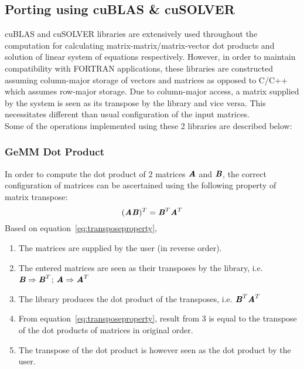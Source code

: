 \documentclass[thesis.tex]{subfiles}
\begin{document}
\subsection{Porting using cuBLAS \& cuSOLVER}
cuBLAS and cuSOLVER libraries are extensively used throughout the computation for calculating matrix-matrix/matrix-vector dot products and solution of linear system of equations respectively. However, in order to maintain compatibility with FORTRAN applications, these libraries are constructed assuming column-major storage of vectors and matrices as opposed to C/C++ which assumes row-major storage. Due to column-major access, a matrix supplied by the system is seen as its transpose by the library and vice versa. This necessitates different than usual configuration of the input matrices.\\
Some of the operations implemented using these 2 libraries are described below:

\subsubsection{GeMM Dot Product}
In order to compute the dot product of 2 matrices $\textbf{\textit{A}}$ and $\textbf{\textit{B}}$, the correct configuration of matrices can be ascertained using the following property of matrix transpose:
\begin{equation}\label{eq:transposeproperty}
(\textbf{\textit{AB}})^{T} = \textbf{\textit{B}}^{T}\textbf{\textit{A}}^{T}
\end{equation}
Based on equation~\ref{eq:transposeproperty}, 
\begin{enumerate}
	\item The matrices are supplied by the user (in reverse order).
	\item The entered matrices are seen as their transposes by the library, i.e. \\$\textbf{\textit{B}} \Rightarrow \textbf{\textit{B}}^{T}$; $\textbf{\textit{A}} \Rightarrow \textbf{\textit{A}}^{T}$ 
	\item The library produces the dot product of the transposes, i.e. $\textbf{\textit{B}}^{T}\textbf{\textit{A}}^{T} $
	\item From equation~\ref{eq:transposeproperty}, result from 3 is equal to the transpose of the dot products of matrices in original order. 
	\item The transpose of the dot product is however seen as the dot product by the user. 
\end{enumerate}
\end{document}
